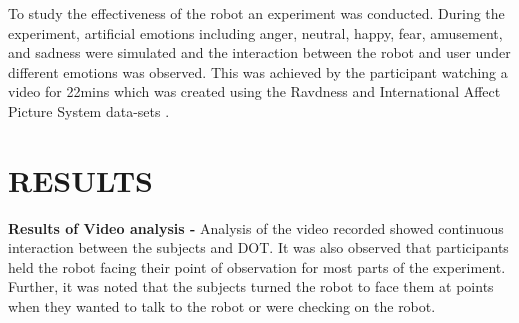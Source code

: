 \documentclass[letterpaper, 10 pt, conference]{ieeeconf}  %
\begin{document}
To study the effectiveness of the robot an experiment was conducted. During
the experiment, artificial emotions including anger, neutral, happy, fear, amusement, and sadness were simulated and the interaction between the robot and user under different emotions was observed. This was achieved by the participant watching a video for 22mins which was created using the Ravdness and International Affect Picture System data-sets \cite{}. 





\section{RESULTS}
\textbf{Results of Video analysis -}
Analysis of the video recorded showed continuous interaction between the subjects and DOT. It was also observed that participants held the robot facing their point of observation for most parts of the experiment. Further, it was noted that the subjects turned the robot to face them at points when they wanted to talk to the robot or were checking on the robot. 
\end{document}
